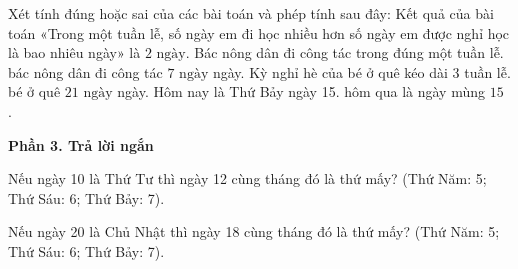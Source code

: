 \begin{ex} %
Xét tính đúng hoặc sai của các bài toán và phép tính sau đây:
\choiceTF
{Kết quả của bài toán «Trong một tuần lễ, số ngày em đi học nhiều hơn số ngày em được nghỉ học là bao nhiêu ngày» là $2\text{ ngày}$.}
{\True Bác nông dân đi công tác trong đúng một tuần lễ. bác nông dân đi công tác $7\text{ ngày}$ ngày.}
{\True Kỳ nghỉ hè của bé ở quê kéo dài 3 tuần lễ. bé ở quê $21\text{ ngày}$ ngày.}
{Hôm nay là Thứ Bảy ngày 15. hôm qua là ngày mùng $15$ .}
\end{ex}

\textbf{Phần 3. Trả lời ngắn}

\begin{ex} %
Nếu ngày 10 là Thứ Tư thì ngày 12 cùng tháng đó là thứ mấy? (Thứ Năm: 5; Thứ Sáu: 6; Thứ Bảy: 7).
\end{ex}

\begin{ex} %
Nếu ngày 20 là Chủ Nhật thì ngày 18 cùng tháng đó là thứ mấy? (Thứ Năm: 5; Thứ Sáu: 6; Thứ Bảy: 7).
\end{ex}

